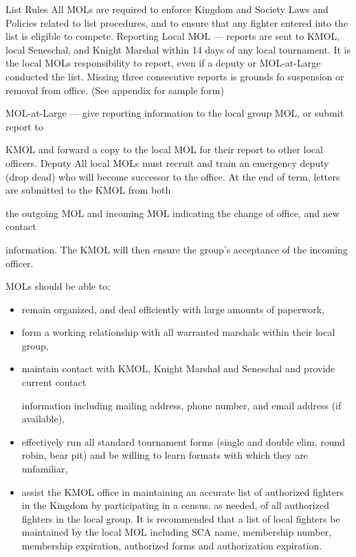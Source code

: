 \documentclass{article}
\begin{document}
List Rules All MOLs are required to enforce Kingdom and Society Laws and Policies related
to list procedures, and to ensure that any fighter entered into the list is eligible to compete.
Reporting Local MOL --- reports are sent to KMOL, local Seneschal, and Knight Marshal within 14
days of any local tournament. It is the local MOLs responsibility to report, even if a deputy
or MOL-at-Large conducted the list. Missing three consecutive reports is grounds fo
suspension or removal from office. (See appendix for sample form)






MOL-at-Large --- give reporting information to the local group MOL, or submit report to


KMOL and forward a copy to the local MOL for their report to other local officers.
Deputy All local MOLs must recruit and train an emergency deputy (drop dead) who will become
successor to the office. At the end of term, letters are submitted to the KMOL from both

the outgoing MOL and incoming MOL indicating the change of office, and new contact

information. The KMOL will then ensure the group’s acceptance of the incoming officer.


MOLs should be able to:
\begin{itemize}
\item remain organized, and deal efficiently with large amounts of paperwork,


\item form a working relationship with all warranted marshals within their local group,
\item maintain contact with KMOL, Knight Marshal and Seneschal and provide current contact

information including mailing address, phone number, and email address (if available),


\item effectively run all standard tournament forms (single and double elim, round robin, bear pit) and
be willing to learn formats with which they are unfamiliar,

\item assist the KMOL office in maintaining an accurate list of authorized fighters in the Kingdom by
participating in a census, as needed, of all authorized fighters in the local group. It is
recommended that a list of local fighters be maintained by the local MOL including SCA name,
membership number, membership expiration, authorized forms and authorization expiration.
\end{itemize}
\end{document}
